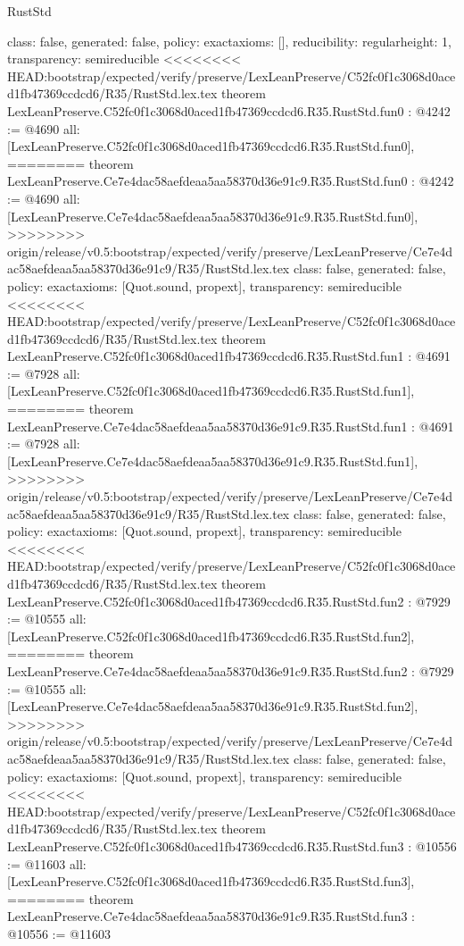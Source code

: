 \begin{lexlean}{RustStd}
\begin{coremodule}
{\begin{coremodule}
{{{  class: false,
  generated: false,
  policy: exact{axioms: []},
  reducibility: regular{height: 1},
  transparency: semireducible
}
<<<<<<<< HEAD:bootstrap/expected/verify/preserve/LexLeanPreserve/C52fc0f1c3068d0aced1fb47369ccdcd6/R35/RustStd.lex.tex
theorem LexLeanPreserve.C52fc0f1c3068d0aced1fb47369ccdcd6.R35.RustStd.fun0 : @4242 := @4690 {
  all: [LexLeanPreserve.C52fc0f1c3068d0aced1fb47369ccdcd6.R35.RustStd.fun0],
========
theorem LexLeanPreserve.Ce7e4dac58aefdeaa5aa58370d36e91c9.R35.RustStd.fun0 : @4242 := @4690 {
  all: [LexLeanPreserve.Ce7e4dac58aefdeaa5aa58370d36e91c9.R35.RustStd.fun0],
>>>>>>>> origin/release/v0.5:bootstrap/expected/verify/preserve/LexLeanPreserve/Ce7e4dac58aefdeaa5aa58370d36e91c9/R35/RustStd.lex.tex
  class: false,
  generated: false,
  policy: exact{axioms: [Quot.sound, propext]},
  transparency: semireducible
}
<<<<<<<< HEAD:bootstrap/expected/verify/preserve/LexLeanPreserve/C52fc0f1c3068d0aced1fb47369ccdcd6/R35/RustStd.lex.tex
theorem LexLeanPreserve.C52fc0f1c3068d0aced1fb47369ccdcd6.R35.RustStd.fun1 : @4691 := @7928 {
  all: [LexLeanPreserve.C52fc0f1c3068d0aced1fb47369ccdcd6.R35.RustStd.fun1],
========
theorem LexLeanPreserve.Ce7e4dac58aefdeaa5aa58370d36e91c9.R35.RustStd.fun1 : @4691 := @7928 {
  all: [LexLeanPreserve.Ce7e4dac58aefdeaa5aa58370d36e91c9.R35.RustStd.fun1],
>>>>>>>> origin/release/v0.5:bootstrap/expected/verify/preserve/LexLeanPreserve/Ce7e4dac58aefdeaa5aa58370d36e91c9/R35/RustStd.lex.tex
  class: false,
  generated: false,
  policy: exact{axioms: [Quot.sound, propext]},
  transparency: semireducible
}
<<<<<<<< HEAD:bootstrap/expected/verify/preserve/LexLeanPreserve/C52fc0f1c3068d0aced1fb47369ccdcd6/R35/RustStd.lex.tex
theorem LexLeanPreserve.C52fc0f1c3068d0aced1fb47369ccdcd6.R35.RustStd.fun2 : @7929 := @10555 {
  all: [LexLeanPreserve.C52fc0f1c3068d0aced1fb47369ccdcd6.R35.RustStd.fun2],
========
theorem LexLeanPreserve.Ce7e4dac58aefdeaa5aa58370d36e91c9.R35.RustStd.fun2 : @7929 := @10555 {
  all: [LexLeanPreserve.Ce7e4dac58aefdeaa5aa58370d36e91c9.R35.RustStd.fun2],
>>>>>>>> origin/release/v0.5:bootstrap/expected/verify/preserve/LexLeanPreserve/Ce7e4dac58aefdeaa5aa58370d36e91c9/R35/RustStd.lex.tex
  class: false,
  generated: false,
  policy: exact{axioms: [Quot.sound, propext]},
  transparency: semireducible
}
<<<<<<<< HEAD:bootstrap/expected/verify/preserve/LexLeanPreserve/C52fc0f1c3068d0aced1fb47369ccdcd6/R35/RustStd.lex.tex
theorem LexLeanPreserve.C52fc0f1c3068d0aced1fb47369ccdcd6.R35.RustStd.fun3 : @10556 := @11603 {
  all: [LexLeanPreserve.C52fc0f1c3068d0aced1fb47369ccdcd6.R35.RustStd.fun3],
========
theorem LexLeanPreserve.Ce7e4dac58aefdeaa5aa58370d36e91c9.R35.RustStd.fun3 : @10556 := @11603 {
}}}}}}}
\end{coremodule}}
\end{coremodule}
\end{lexlean}
